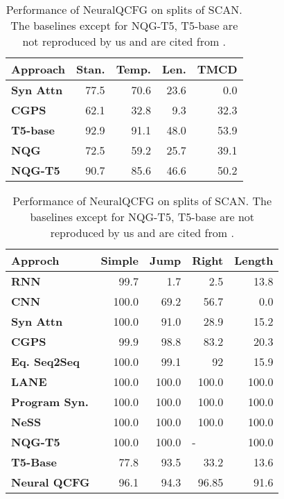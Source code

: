 \begin{table}
\scriptsize
\parbox{.43\linewidth}{
\begin{tabular}{lrrrr}
\toprule
\textbf{Approach} &
  \multicolumn{1}{l}{\textbf{Stan.}} &
  \multicolumn{1}{l}{\textbf{Temp.}} &
  \multicolumn{1}{l}{\textbf{Len.}} &
  \multicolumn{1}{l}{\textbf{TMCD}} \\
  \midrule
\textbf{Syn Attn \cite{russin2019compositional}} & 77.5 & 70.6 & 23.6 & 0.0    \\
\textbf{CGPS \cite{li2019compositional}}          & 62.1 & 32.8 & 9.3  & 32.3 \\
\textbf{T5-base}       & 92.9 & 91.1 & 48.0 & 53.9 \\
\textbf{NQG}           & 72.5 & 59.2 & 25.7 & 39.1 \\
\textbf{NQG-T5}        & 90.7 & 85.6 & 46.6 & 50.2 \\
\midrule
\end{tabular}
\caption{\footnotesize Performance of NQG-T5 and its baselines on the splits of GEOQUERY. Stan., Temp., and Len.~are abbreviations of standard, template, and length respectively.}
\label{tab:nqg-perf}
}
\hspace{1.5mm}
\parbox{.48\linewidth}{
\begin{tabular}{lrrrr}
\toprule
\textbf{Approch} & \multicolumn{1}{l}{\textbf{Simple}} & \multicolumn{1}{l}{\textbf{Jump}} & \multicolumn{1}{l}{\textbf{Right}} & \multicolumn{1}{l}{\textbf{Length}} \\
\midrule
\textbf{RNN \cite{lake2018generalization}}              & 99.7 & 1.7  & 2.5                   & 13.8 \\
\textbf{CNN \cite{dessi2019cnns}}              & 100.0  & 69.2 & 56.7                  & 0.0    \\
\textbf{Syn Attn \cite{russin2019compositional}}    & 100.0  & 91.0   & 28.9                  & 15.2 \\
\textbf{CGPS \cite{li2019compositional}}             & 99.9 & 98.8 & 83.2                  & 20.3 \\
\textbf{Eq. Seq2Seq \cite{gordon2020permutation}} & 100.0  & 99.1 & 92                    & 15.9 \\
\textbf{LANE \cite{liu2020compositional}}             & 100.0  & 100.0  & 100.0                   & 100.0  \\
\textbf{Program Syn. \cite{nye2020learning}}   & 100.0  & 100.0  & 100.0                   & 100.0  \\
\textbf{NeSS \cite{chen2020compositional}}             & 100.0  & 100.0  & 100.0                   & 100.0  \\
\textbf{NQG-T5}           & 100.0  & 100.0  & \multicolumn{1}{l}{-} & 100.0  \\
\textbf{T5-Base}          & 77.8 & 93.5 & 33.2                  & 13.6 \\
\textbf{Neural QCFG}      & 96.1 & 94.3 & 96.85                 & 91.6 \\
\bottomrule
\end{tabular}
\caption{\footnotesize Performance of NeuralQCFG on splits of SCAN. The baselines except for NQG-T5, T5-base are not reproduced by us and are cited from \cite{kim2021sequencetosequence}.}
\label{tab:nqcfg-perf}
}
\end{table}
